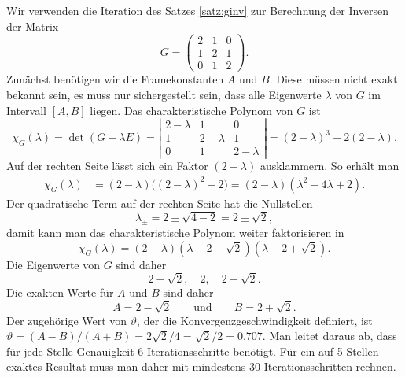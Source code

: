 \begin{beispiel}
Wir verwenden die Iteration des Satzes \ref{satz:ginv} zur Berechnung
der Inversen der Matrix
\[
G=\begin{pmatrix}2&1&0\\1&2&1\\0&1&2\end{pmatrix}.
\]
Zunächst benötigen wir die Framekonstanten $A$ und $B$.
Diese müssen nicht exakt bekannt sein, es muss nur sichergestellt sein,
dass alle Eigenwerte $\lambda$ von $G$ im Intervall $[A,B]$ liegen.
Das charakteristische Polynom von $G$ ist
\[
\chi_{G}(\lambda)
=
\det(G-\lambda E)
=
\left|
\begin{matrix}
2-\lambda&1&0\\1&2-\lambda&1\\0&1&2-\lambda
\end{matrix}
\right|
=
(2-\lambda)^3-2(2-\lambda).
\]
Auf der rechten Seite lässt sich ein Faktor $(2-\lambda)$ ausklammern.
So erhält man
\begin{align*}
\chi_{G}(\lambda)
&=
(2-\lambda)\bigl((2-\lambda)^2-2\bigr)
=
(2-\lambda)
(\lambda^2 -4\lambda+2).
\end{align*}
Der quadratische Term auf der rechten Seite hat die Nullstellen
\[
\lambda_{\pm} = 2 \pm \sqrt{4-2} = 2 \pm\sqrt{2},
\]
damit kann man das charakteristische Polynom weiter faktorisieren
in
\[
\chi_{G}(\lambda)
=
(2-\lambda)
(\lambda -2-\sqrt{2})(\lambda -2+\sqrt{2}).
\]
Die Eigenwerte von $G$ sind daher
\[
2-\sqrt{2},\quad
2,\quad
2+\sqrt{2}.
\]
Die exakten Werte für $A$ und $B$ sind daher
\[
A=2-\sqrt{2}
\qquad\text{und}\qquad
B=2+\sqrt{2}.
\]
Der zugehörige Wert von $\vartheta$, der die Konvergenzgeschwindigkeit
definiert, ist $\vartheta = (A-B)/(A+B)=2\sqrt{2}/4=\sqrt{2}/2=0.707$.
Man leitet daraus ab, dass für jede Stelle Genauigkeit 6 Iterationsschritte
benötigt.
Für ein auf 5 Stellen exaktes Resultat muss man daher mit mindestens 30
Iterationsschritten rechnen.


\end{beispiel}
